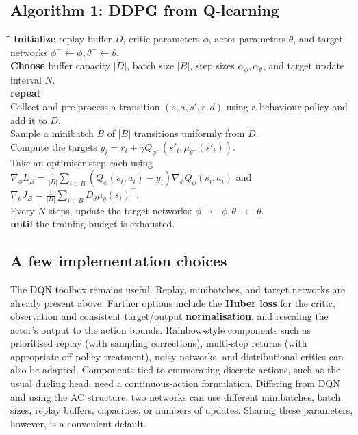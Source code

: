 \documentclass[11pt,a4paper]{article}
\begin{document}
\subsection{Algorithm 1: DDPG from Q-learning}
{\small
\begin{tabbing}
\hspace{1.3em}\=\hspace{1.3em}\=\kill
\textbf{Initialize} replay buffer $D$, critic parameters $\phi$, actor parameters $\theta$, and target networks $\phi^-\leftarrow\phi,\theta^-\leftarrow\theta$.\\
\> \textbf{Choose} buffer capacity $\lvert D\rvert$, batch size $|B|$, step sizes $\alpha_\phi,\alpha_\theta$, and target update interval $N$.\\
\textbf{repeat}\\
\> Collect and pre-process a transition $(s,a,s',r,d)$ using a behaviour policy and add it to $D$.\\
\> Sample a minibatch $B$ of $|B|$ transitions uniformly from $D$.\\
\> Compute the targets $y_i=r_i+\gamma Q_{\phi^-}(s'_i,\mu_{\theta^-}(s'_i))$.\\
\> Take an optimiser step each using\\
\> $\nabla_\phi L_B=\frac{1}{|B|}\sum_{i\in B}(Q_\phi(s_i,a_i)-y_i)\nabla_\phi Q_\phi(s_i,a_i)$ and $\nabla_\theta J_B=\frac{1}{|B|}\sum_{i\in B}D_\theta\mu_\theta(s_i)^\top$.\\
\> Every $N$ steps, update the target networks: $\phi^-\leftarrow\phi,\theta^-\leftarrow\theta$.\\
\textbf{until} the training budget is exhausted.
\end{tabbing}}

\subsection{A few implementation choices}

The DQN toolbox remains useful. Replay, minibatches, and target networks are already present above. Further
options include the \textbf{Huber loss} for the critic, observation and
consistent target/output \textbf{normalisation}, and rescaling the actor's
output to the action bounds. Rainbow-style components such as prioritised
replay (with sampling corrections), multi-step returns (with appropriate
off-policy treatment), noisy networks, and distributional critics can also
be adapted. Components tied to enumerating discrete actions, such as the
usual dueling head, need a continuous-action formulation. Differing from DQN and using the AC structure, two networks can use different
minibatches, batch sizes, replay buffers, capacities, or numbers of updates.
Sharing these parameters, however, is a convenient default. 
\end{document}
